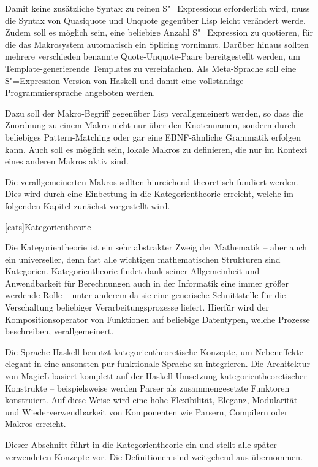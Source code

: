 \documentclass[12pt, a4paper, bibgerm]{scrbook}
\newcommand\lchapter{}
\newcommand{\sexp}{S"=Expression}
\newcommand{\sexps}{S"=Expressions}
\begin{document}
Damit keine zusätzliche Syntax zu reinen \sexps{} erforderlich wird,
muss die Syntax von Quasiquote und Unquote gegenüber Lisp leicht
verändert werde. Zudem soll es möglich sein, eine beliebige Anzahl
\sexp{} zu quotieren, für die das Makrosystem automatisch ein Splicing
vornimmt. Darüber hinaus sollten mehrere verschieden benannte
Quote-Unquote-Paare bereitgestellt werden, um Template-generierende
Templates zu vereinfachen. Als Meta-Sprache soll eine \sexp{}-Version
von Haskell und damit eine vollständige Programmiersprache
angeboten werden.

Dazu soll der Makro-Begriff gegenüber Lisp verallgemeinert werden, so
dass die Zuordnung zu einem Makro nicht nur über den Knotennamen,
sondern durch beliebiges Pattern-Matching oder gar eine EBNF-ähnliche
Grammatik erfolgen kann. Auch soll es möglich sein, lokale Makros zu
definieren, die nur im Kontext eines anderen Makros aktiv sind.  

Die verallgemeinerten Makros sollten hinreichend theoretisch fundiert
werden. Dies wird durch eine Einbettung in die Kategorientheorie
erreicht, welche im folgenden Kapitel zunächst vorgestellt wird.

\lchapter[cats]{Kategorientheorie}

Die Kategorientheorie ist ein sehr abstrakter Zweig der Mathematik --
aber auch ein universeller, denn fast alle wichtigen mathematischen
Strukturen sind Kategorien. Kategorientheorie findet dank seiner
Allgemeinheit und Anwendbarkeit für Berechnungen auch in der Informatik
eine immer größer werdende Rolle -- unter anderem da sie eine generische
Schnittstelle für die Verschaltung beliebiger Verarbeitungsprozesse
liefert. Hierfür wird der Kompositionsoperator von Funktionen auf
beliebige Datentypen, welche Prozesse beschreiben, verallgemeinert.

Die Sprache Haskell benutzt kategorientheoretische Konzepte, um
Nebeneffekte elegant in eine ansonsten pur funktionale Sprache zu
integrieren. Die Architektur von MagicL basiert komplett auf der
Haskell-Umsetzung kategorientheoretischer Konstrukte -- beispielsweise
werden Parser als zusammengesetzte Funktoren konstruiert. Auf diese
Weise wird eine hohe Flexibilität, Eleganz, Modularität und
Wiederverwendbarkeit von Komponenten wie Parsern, Compilern oder Makros
erreicht.

Dieser Abschnitt führt in die Kategorientheorie ein und
stellt alle später verwendeten Konzepte vor. Die Definitionen sind
weitgehend aus \cite{Grundlagen} übernommen.
\end{document}
